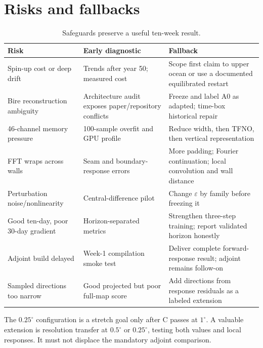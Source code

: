 \documentclass[11pt]{article}
\begin{document}
\section{Risks and fallbacks}
\begin{table}[htbp]\centering\small
\caption{Safeguards preserve a useful ten-week result.}
\label{tab:risks}
\begin{tabularx}{\textwidth}{@{}p{}Yp{0.31\textwidth}@{}}
\toprule
\textbf{Risk} & \textbf{Early diagnostic} & \textbf{Fallback} \\
\midrule
Spin-up cost or deep drift & Trends after year 50; measured cost & Scope first claim to upper ocean or use a documented equilibrated restart \\
Bire reconstruction ambiguity & Architecture audit exposes paper/repository conflicts & Freeze and label A0 as adapted; time-box historical repair \\
46-channel memory pressure & 100-sample overfit and GPU profile & Reduce width, then TFNO, then vertical representation \\
FFT wraps across walls & Seam and boundary-response errors & More padding; Fourier continuation; local convolution and wall distance \\
Perturbation noise/nonlinearity & Central-difference pilot & Change \(\varepsilon\) by family before freezing it \\
Good ten-day, poor 30-day gradient & Horizon-separated metrics & Strengthen three-step training; report validated horizon honestly \\
Adjoint build delayed & Week-1 compilation smoke test & Deliver complete forward-response result; adjoint remains follow-on \\
Sampled directions too narrow & Good projected but poor full-map score & Add directions from response residuals as a labeled extension \\
\bottomrule
\end{tabularx}
\end{table}

The \(0.25^\circ\) configuration is a stretch goal only after C passes at \(1^\circ\).
A valuable extension is resolution transfer at \(0.5^\circ\) or \(0.25^\circ\), testing
both values and local responses. It must not displace the mandatory adjoint comparison.
\end{document}
